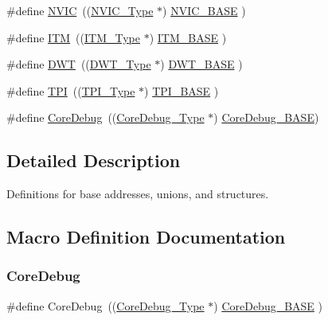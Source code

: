 \begin{DoxyCompactItemize}
\item 
\#define \hyperlink{group___c_m_s_i_s__core__base_gac8e97e8ce56ae9f57da1363a937f8a17}{N\+V\+IC}~((\hyperlink{struct_n_v_i_c___type}{N\+V\+I\+C\+\_\+\+Type}      $\ast$)     \hyperlink{group___c_m_s_i_s__core__base_gaa0288691785a5f868238e0468b39523d}{N\+V\+I\+C\+\_\+\+B\+A\+SE}     )
\item 
\#define \hyperlink{group___c_m_s_i_s__core__base_gabae7cdf882def602cb787bb039ff6a43}{I\+TM}~((\hyperlink{struct_i_t_m___type}{I\+T\+M\+\_\+\+Type}       $\ast$)     \hyperlink{group___c_m_s_i_s__core__base_gadd76251e412a195ec0a8f47227a8359e}{I\+T\+M\+\_\+\+B\+A\+SE}      )
\item 
\#define \hyperlink{group___c_m_s_i_s__core__base_gabbe5a060185e1d5afa3f85b14e10a6ce}{D\+WT}~((\hyperlink{struct_d_w_t___type}{D\+W\+T\+\_\+\+Type}       $\ast$)     \hyperlink{group___c_m_s_i_s__core__base_gafdab534f961bf8935eb456cb7700dcd2}{D\+W\+T\+\_\+\+B\+A\+SE}      )
\item 
\#define \hyperlink{group___c_m_s_i_s__core__base_ga8b4dd00016aed25a0ea54e9a9acd1239}{T\+PI}~((\hyperlink{struct_t_p_i___type}{T\+P\+I\+\_\+\+Type}       $\ast$)     \hyperlink{group___c_m_s_i_s__core__base_ga2b1eeff850a7e418844ca847145a1a68}{T\+P\+I\+\_\+\+B\+A\+SE}      )
\item 
\#define \hyperlink{group___c_m_s_i_s__core__base_gab6e30a2b802d9021619dbb0be7f5d63d}{Core\+Debug}~((\hyperlink{struct_core_debug___type}{Core\+Debug\+\_\+\+Type} $\ast$)     \hyperlink{group___c_m_s_i_s__core__base_ga680604dbcda9e9b31a1639fcffe5230b}{Core\+Debug\+\_\+\+B\+A\+SE})
\end{DoxyCompactItemize}


\subsection{Detailed Description}
Definitions for base addresses, unions, and structures. 



\subsection{Macro Definition Documentation}
\mbox{\label{group___c_m_s_i_s__core__base_gab6e30a2b802d9021619dbb0be7f5d63d}} 
\subsubsection{\texorpdfstring{Core\+Debug}{CoreDebug}\hspace{0.1cm}{\footnotesize\ttfamily [1/8]}}
{\footnotesize\ttfamily \#define Core\+Debug~((\hyperlink{struct_core_debug___type}{Core\+Debug\+\_\+\+Type} $\ast$)     \hyperlink{group___c_m_s_i_s__core__base_ga680604dbcda9e9b31a1639fcffe5230b}{Core\+Debug\+\_\+\+B\+A\+SE}   )}


